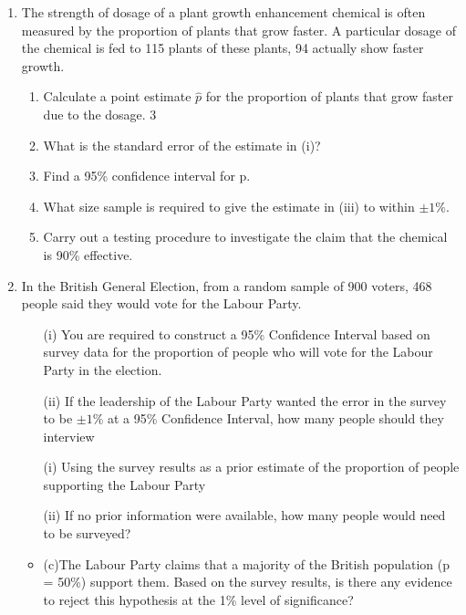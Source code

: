 \documentclass[]{report}
\begin{document}
\begin{enumerate}
\item 
The strength of dosage of a plant growth enhancement chemical 
is often measured by the proportion of plants that grow faster. 
A particular dosage of the chemical is fed to 115 plants of these plants, 94 actually show faster growth. 

\begin{enumerate}       
\item Calculate a point estimate $\hat{p}$ for the proportion of plants that grow faster due to the  dosage. 3 

\item What is the standard error of the estimate in (i)? 

\item Find a 95\% confidence interval for p.  

\item What size sample is required to give the estimate in (iii) to within $\pm 1\%$.  

\item Carry out a testing procedure to investigate the claim that the chemical is 90\% effective.

\end{enumerate}





\item
In the British General Election, from a random sample of 900 voters, 468 people said they would vote for the Labour Party.  
\begin{itemize}
	\item[(i)] You are required to construct a 95\% Confidence Interval based on survey data for the proportion of people who will vote for the Labour Party in the election.
	
\item[(ii)]If the leadership of the Labour Party wanted the error in the survey to be $\pm 1\%$ at a 95\% Confidence Interval, how many people should they interview
	
\end{itemize}

\begin{itemize}
	\item[(i)]Using the survey results as a prior estimate of the proportion of people supporting the Labour Party
	\item[(ii)]If no prior information were available, how many people would need to be surveyed?
\item (c)The Labour Party claims that a majority of the British population (p = 50\%) support them.  Based on the survey results, is there any evidence to reject this hypothesis at the 1\% level of significance? 


\end{itemize}
\end{enumerate}
\end{document}
